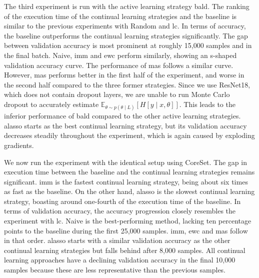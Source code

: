The third experiment is run with the active learning strategy \gls{bald}. The ranking of the execution time of the continual learning strategies and the baseline is similar to
the previous experiments with Random and \gls{lc}. In terms of accuracy, the baseline outperforms the continual learning strategies significantly. The gap between
validation accuracy is most prominent at roughly 15,000 samples and in the final batch. Naive, \gls{imm} and \gls{ewc} perform similarly, showing an
s-shaped validation accuracy curve. The performance of \gls{mas} follows a similar curve. However, \gls{mas} performs better in the first half of the experiment,
and worse in the second half compared to the three former strategies. Since we use ResNet18, which does not contain dropout layers, we are unable to run Monte Carlo
dropout to accurately estimate $\mathbb{E}_{\theta \sim p(\theta \mid L)} [H[y \mid x, \theta]]$. This leads to the inferior performance of \gls{bald} compared to the
other active learning strategies. \gls{alasso} starts as the best continual learning strategy, but its validation accuracy decreases steadily throughout the
experiment, which is again caused by exploding gradients. \par 



We now run the experiment with the identical setup using CoreSet. The gap in execution time between the baseline and the continual learning 
strategies remains significant. \gls{imm} is the fastest continual learning strategy, being about six times as fast as the baseline. On the other hand, \gls{alasso}
is the slowest continual learning strategy, boasting around one-fourth of the execution time of the baseline. In terms of validation accuracy, the accuracy progression
closely resembles the experiment with \gls{lc}. Naive is the best-performing method, lacking ten percentage points to the baseline during the first 25,000 samples. \gls{imm},
\gls{ewc} and \gls{mas} follow in that order. \gls{alasso} starts with a similar validation accuracy as the other continual learning strategies but falls behind after 8,000 samples.
All continual learning approaches have a declining validation accuracy in the final 10,000 samples because these are less representative
than the previous samples. \par



